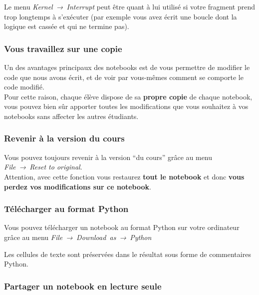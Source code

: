     Le menu \emph{Kernel~→~Interrupt} peut être quant à lui utilisé si votre
fragment prend trop longtemps à s'exécuter (par exemple vous avez écrit
une boucle dont la logique est cassée et qui ne termine pas).

    \hypertarget{vous-travaillez-sur-une-copie}{%
\subsubsection{Vous travaillez sur une
copie}\label{vous-travaillez-sur-une-copie}}

    Un des avantages principaux des notebooks est de vous permettre de
modifier le code que nous avons écrit, et de voir par vous-mêmes comment
se comporte le code modifié.\\

Pour cette raison, chaque élève dispose de sa \textbf{propre copie} de
chaque notebook, vous pouvez bien sûr apporter toutes les modifications
que vous souhaitez à vos notebooks sans affecter les autres étudiants.

    \hypertarget{revenir-uxe0-la-version-du-cours}{%
\subsubsection{Revenir à la version du
cours}\label{revenir-uxe0-la-version-du-cours}}

    Vous pouvez toujours revenir à la version ``du cours'' grâce au menu
\emph{File~→~Reset to original}.\\

    Attention, avec cette fonction vous restaurez \textbf{tout le notebook}
et donc \textbf{vous perdez vos modifications sur ce notebook}.

    \hypertarget{tuxe9luxe9charger-au-format-python}{%
\subsubsection{Télécharger au format
Python}\label{tuxe9luxe9charger-au-format-python}}

    Vous pouvez télécharger un notebook au format Python sur votre
ordinateur grâce au menu \emph{File~→~Download~as~→~Python}

    Les cellules de texte sont préservées dans le résultat sous forme de
commentaires Python.

    \hypertarget{partager-un-notebook-en-lecture-seule}{%
\subsubsection{Partager un notebook en lecture
seule}\label{partager-un-notebook-en-lecture-seule}}

